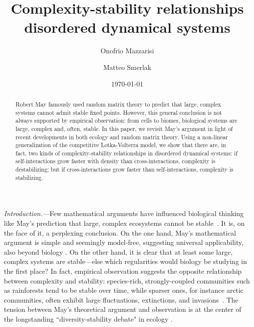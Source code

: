 \documentclass[
 prl,
 twocolumn,
 amsmath,
 amssymb,
 aps,
]{revtex4-2}
\begin{document}
\title{Complexity-stability relationships disordered dynamical systems}

\author{Onofrio Mazzarisi}

\author{Matteo Smerlak}


\date{\today}

\begin{abstract}
    Robert May famously used random matrix theory to predict that large, complex systems cannot admit stable fixed points. 
    However, this general conclusion is not always supported by empirical observation: from cells to biomes, biological systems are large, complex and, often, stable.
    In this paper, we revisit May's argument in light of recent developments in both ecology and random matrix theory. 
    Using a non-linear generalization of the competitive Lotka-Volterra model, we show that there are, in fact, two kinds of complexity-stability relationships in disordered dynamical systems:
    if self-interactions grow faster with density than cross-interactions, complexity is destabilizing; but if cross-interactions grow faster than self-interactions, complexity is stabilizing.
\end{abstract}

\maketitle

\paragraph*{}
\emph{Introduction.---}Few mathematical arguments have influenced biological thinking like May's prediction that large, complex ecosystems cannot be stable~\cite{May1972}.
It is, on the face of it, a perplexing conclusion.
On the one hand, May's mathematical argument is simple and seemingly model-free, suggesting universal applicability, also beyond biology \cite{Haldane2011, Moran2019}.
On the other hand, it is clear that at least some large, complex systems are stable---else which regularities would biology be studying in the first place? 
In fact, empirical observation suggests the opposite relationship between complexity and stability: species-rich, strongly-coupled communities such as rainforests tend to be stable over time, while sparser ones, for instance arctic communities, often exhibit large fluctuations, extinctions, and invasions~\cite{Hutchinson1959,Odum1959,MacArthur1955}. 
The tension between May's theoretical argument and observation is at the center of the longstanding ``diversity-stability debate" in ecology \cite{McCann2000, Loreau2022}.
\end{document}
